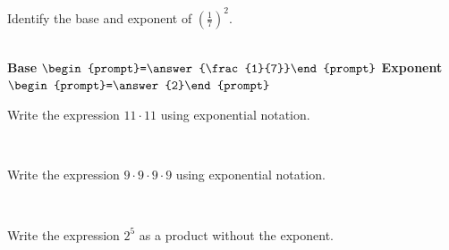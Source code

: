 \documentclass{ximera}
\begin{document}
\begin{problem} Identify the base and exponent of $\displaystyle \left(\frac{1}{7} \right)^2.$

  ~ \\[3em]  %

\hspace{2in} \textbf{Base} $\begin{prompt}=\answer{\frac{1}{7}}\end{prompt}$  \hspace{1in}  \textbf{Exponent} $\begin{prompt}=\answer{2}\end{prompt}$

\end{problem}


\begin{problem} Write the expression $11 \cdot 11 $ using exponential notation.

  ~ \\[3em]  %

\begin{multipleChoice}
  \end{multipleChoice}

\end{problem}


\begin{problem} Write the expression $9 \cdot 9 \cdot 9 \cdot 9$ using exponential notation.

  ~ \\[3em]  %

\begin{multipleChoice}
  \end{multipleChoice}

\end{problem}


\begin{problem} Write the expression $2^5$ as a product without the exponent.

  ~ \\[3em]  %

\begin{multipleChoice}
  \end{multipleChoice}

\end{problem}
\end{document}
